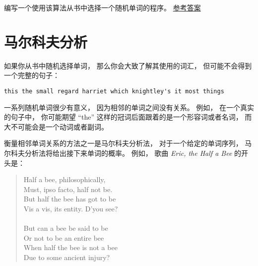 \begin{exercise}
\label{randhist}
\end{exercise}

编写一个使用该算法从书中选择一个随机单词的程序。
\href{http://thinkpython2.com/code/analyze_book3.py}{参考答案}


\section{马尔科夫分析}
\label{markov}


如果你从书中随机选择单词， 那么你会大致了解其使用的词汇， 但可能不会得到一个完整的句子：

\begin{lstlisting}
this the small regard harriet which knightley's it most things
\end{lstlisting}


一系列随机单词很少有意义， 因为相邻的单词之间没有关系。
例如， 在一个真实的句子中， 你可能期望 ``the'' 这样的冠词后面跟着的是一个形容词或者名词，
而大不可能会是一个动词或者副词。


衡量相邻单词关系的方法之一是马尔科夫分析法， 对于一个给定的单词序列，
马尔科夫分析法将给出接下来单词的概率。   例如， 歌曲 {\em Eric, the Half a
Bee} 的开头是：

\begin{quote}
Half a bee, philosophically, \\
Must, ipso facto, half not be. \\
But half the bee has got to be \\
Vis a vis, its entity. D'you see? \\
\\
But can a bee be said to be \\
Or not to be an entire bee \\
When half the bee is not a bee \\
Due to some ancient injury? \\
\end{quote}

